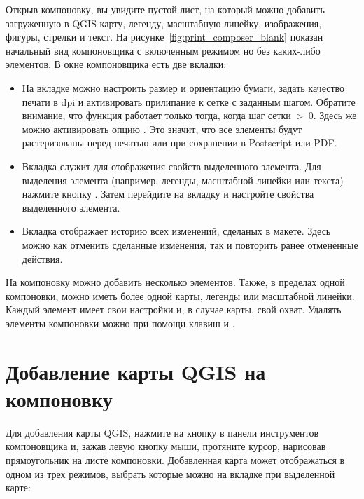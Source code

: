 Открыв компоновку, вы увидите пустой лист, на который можно добавить
загруженную в QGIS карту, легенду, масштабную линейку, изображения,
фигуры, стрелки и текст. На рисунке~\ref{fig:print_composer_blank}
показан начальный вид компоновщика с включенным режимом
 но без каких-либо элементов. В окне
компоновщика есть две вкладки:

\begin{itemize}[label=--]
\item На вкладке  можно настроить размер и ориентацию бумаги,
задать качество печати в dpi и активировать прилипание к сетке с заданным
шагом. Обратите внимание, что функция 
работает только тогда, когда шаг сетки~>~0. Здесь же можно активировать
опцию . Это значит, что все элементы будут
растеризованы перед печатью или при сохранении в Postscript или PDF.
\item Вкладка  служит для отображения свойств выделенного
элемента. Для выделения элемента (например, легенды, масштабной линейки
или текста) нажмите кнопку . Затем перейдите на вкладку  и настройте свойства
выделенного элемента.
\item Вкладка  отображает историю всех изменений, сделаных
в макете. Здесь можно как отменить сделанные изменения, так и повторить
ранее отмененные действия.
\end{itemize}

На компоновку можно добавить несколько элементов. Также, в пределах
одной компоновки, можно иметь более одной карты, легенды или масштабной
линейки. Каждый элемент имеет свои настройки и, в случае карты, свой
охват. Удалять элементы компоновки можно при помощи клавиш 
и .

\section{Добавление карты QGIS на компоновку}

Для добавления карты QGIS, нажмите на кнопку
 в панели инструментов
компоновщика и, зажав левую кнопку мыши, протяните курсор, нарисовав
прямоугольник на листе компоновки. Добавленная карта может отображаться
в одном из трех режимов, выбрать которые можно на вкладке 
при выделенной карте:


